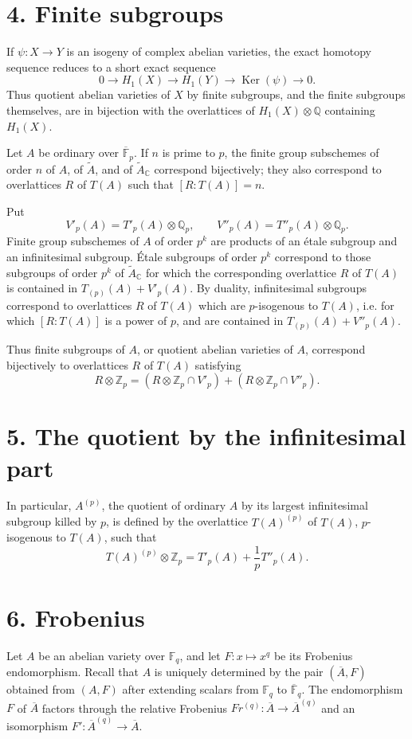 \documentclass[12pt]{article}
\DeclareMathOperator{\Ker}{Ker}
\newcommand{\Z}{\mathbb{Z}}
\newcommand{\Q}{\mathbb{Q}}
\newcommand{\C}{\mathbb{C}}
\newcommand{\F}{\mathbb{F}}
\theoremstyle{plain}
\theoremstyle{definition}
\theoremstyle{remark}
\begin{document}
\section*{4. Finite subgroups}
If $\psi:X\to Y$ is an isogeny of complex abelian varieties, the exact homotopy sequence reduces to a short exact sequence
\[
 0\longrightarrow H_1(X)\longrightarrow H_1(Y)\longrightarrow \Ker(\psi)\longrightarrow0.
\]
Thus quotient abelian varieties of $X$ by finite subgroups, and the finite subgroups themselves, are in bijection with the overlattices of $H_1(X)\otimes\Q$ containing $H_1(X)$.

Let $A$ be ordinary over $\overline{\F}_p$. If $n$ is prime to $p$, the finite group subschemes of order $n$ of $A$, of $\widetilde A$, and of $\widetilde A_\C$ correspond bijectively; they also correspond to overlattices $R$ of $T(A)$ such that $[R:T(A)]=n$.

Put
\[
 V'_p(A)=T'_p(A)\otimes\Q_p,
\qquad
 V''_p(A)=T''_p(A)\otimes\Q_p.
\]
Finite group subschemes of $A$ of order $p^k$ are products of an étale subgroup and an infinitesimal subgroup. Étale subgroups of order $p^k$ correspond to those subgroups of order $p^k$ of $\widetilde A_\C$ for which the corresponding overlattice $R$ of $T(A)$ is contained in $T_{(p)}(A)+V'_p(A)$. By duality, infinitesimal subgroups correspond to overlattices $R$ of $T(A)$ which are $p$-isogenous to $T(A)$, i.e. for which $[R:T(A)]$ is a power of $p$, and are contained in $T_{(p)}(A)+V''_p(A)$.

Thus finite subgroups of $A$, or quotient abelian varieties of $A$, correspond bijectively to overlattices $R$ of $T(A)$ satisfying
\begin{equation}\label{eq:p004-en-41}
 R\otimes\Z_p=(R\otimes\Z_p\cap V'_p)+(R\otimes\Z_p\cap V''_p).
\end{equation}

\section*{5. The quotient by the infinitesimal part}
In particular, $A^{(p)}$, the quotient of ordinary $A$ by its largest infinitesimal subgroup killed by $p$, is defined by the overlattice $T(A)^{(p)}$ of $T(A)$, $p$-isogenous to $T(A)$, such that
\[
 T(A)^{(p)}\otimes\Z_p=T'_p(A)+\frac{1}{p}T''_p(A).
\]

\section*{6. Frobenius}
Let $A$ be an abelian variety over $\F_q$, and let $F:x\mapsto x^q$ be its Frobenius endomorphism. Recall that $A$ is uniquely determined by the pair $(\overline A,F)$ obtained from $(A,F)$ after extending scalars from $\F_q$ to $\overline{\F}_q$. The endomorphism $F$ of $\overline A$ factors through the relative Frobenius $Fr^{(q)}:\overline A\to\overline A^{(q)}$ and an isomorphism $F':\overline A^{(q)}\to\overline A$.
\end{document}
